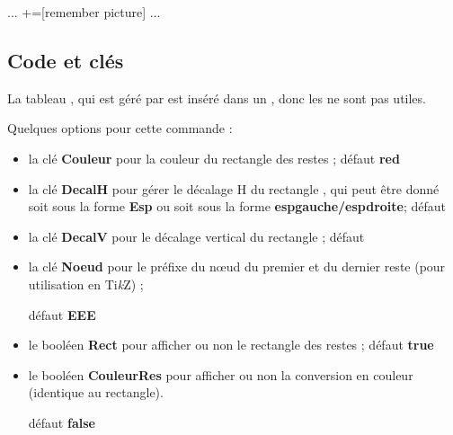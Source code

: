 \documentclass[a4paper,french,11pt]{article}
\providecommand\tikzlogo{Ti\textit{k}Z}
\let\TikZ\tikzlogo
\newcommand\ctex[1]{\tcbox[vignettelatex]{#1}}
\newcommand\Cle[1]{{\bfseries\sffamily\textlangle #1\textrangle}}
\begin{document}
\begin{codetex}
...
+=[remember picture]
...
\end{codetex}

\subsection{Code et clés}

\begin{codetex}[]
\end{codetex}

\begin{codeinfo}
La \og tableau \fg, qui est géré par \ctex{array} est inséré dans un \ctex{ensuremath}, donc les \ctex{\$...\$} ne sont pas utiles.
\end{codeinfo}

\begin{codetex}
\end{codetex}

\begin{codecles}
Quelques options pour cette commande :

\begin{itemize}
	\item la clé \Cle{Couleur} pour la couleur du \og rectangle \fg{} des restes ; \hfill{}défaut \Cle{red}
	\item la clé \Cle{DecalH} pour gérer le décalage H du \og rectangle \fg{}, qui peut être donné soit sous la forme \Cle{Esp} ou soit sous la forme \Cle{espgauche/espdroite}; \hfill{}défaut \Cle{2pt}
	\item la clé \Cle{DecalV} pour le décalage vertical du \og rectangle \fg{} ; \hfill{}défaut \Cle{3pt}
	\item la clé \Cle{Noeud} pour le préfixe du nœud du premier et du dernier reste (pour utilisation en \TikZ) ;
	
	\hfill{}défaut \Cle{EEE}
	\item le booléen \Cle{Rect} pour afficher ou non le \og rectangle \fg{} des restes ; \hfill{}défaut \Cle{true}
	\item le booléen \Cle{CouleurRes} pour afficher ou non la conversion en couleur (identique au rectangle).
	
	\hfill{}défaut \Cle{false}
\end{itemize}
\end{codecles}
\end{document}

